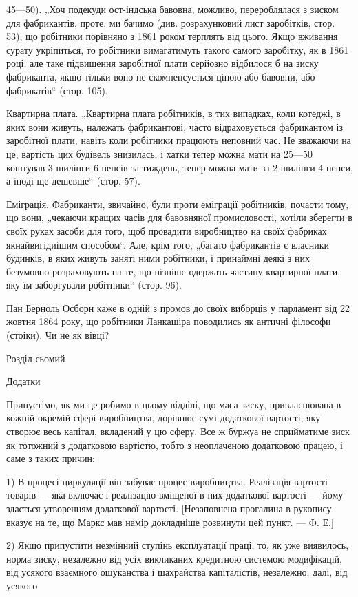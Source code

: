 45—50). „Хоч подекуди ост-індська бавовна, можливо, перероблялася
з зиском для фабрикантів, проте, ми бачимо (див. розрахунковий
лист заробітків, стор. 53), що робітники порівняно
з 1861 роком терплять від цього. Якщо вживання сурату укріпиться,
то робітники вимагатимуть такого самого заробітку, як
в 1861 році; але таке підвищення заробітної плати серйозно
відбилося б на зиску фабриканта, якщо тільки воно не скомпенсується
ціною або бавовни, або фабрикатів“ (стор. 105).

Квартирна плата. „Квартирна плата робітників, в тих випадках,
коли котеджі, в яких вони живуть, належать фабрикантові,
часто відраховується фабрикантом із заробітної плати,
навіть коли робітники працюють неповний час. Не зважаючи
на це, вартість цих будівель знизилась, і хатки тепер можна
мати на 25—50%
коштував 3 шилінги 6 пенсів за тиждень, тепер можна мати за
2 шилінги 4 пенси, а іноді ще дешевше“ (стор. 57).

Еміграція. Фабриканти, звичайно, були проти еміграції робітників,
почасти тому, що вони, „чекаючи кращих часів для бавовняної
промисловості, хотіли зберегти в своїх руках засоби
для того, щоб провадити виробництво на своїх фабриках якнайвигідиішим
способом“. Але, крім того, „багато фабрикантів
є власники будинків, в яких живуть заняті ними робітники,
і принаймні деякі з них безумовно розраховують на те, що
пізніше одержать частину квартирної плати, яку їм заборгували
робітники“ (стор. 96).

Пан Берноль Осборн каже в одній з промов до своїх виборців
у парламент від 22 жовтня 1864 року, що робітники
Ланкашіра поводились як античні філософи (стоіки). Чи не як вівці?

Розділ сьомий

Додатки

Припустімо, як ми це робимо в цьому відділі, що маса
зиску, привласнювана в кожній окремій сфері виробництва, дорівнює
сумі додаткової вартості, яку створює весь капітал, вкладений
у цю сферу. Все ж буржуа не сприйматиме зиск як тотожний
з додатковою вартістю, тобто з неоплаченою додатковою
працею, і саме з таких причин:

1) В процесі циркуляції він забуває процес виробництва.
Реалізація вартості товарів — яка включає і реалізацію вміщеної
в них додаткової вартості — йому здається утворенням додаткової
вартості. [Незаповнена прогалина в рукопису вказує на те,
що Маркс мав намір докладніше розвинути цей пункт. — Ф. Е.]

2) Якщо припустити незмінний ступінь експлуатації праці, то,
як уже виявилось, норма зиску, незалежно від усіх викликаних
кредитною системою модифікацій, від усякого взаємного ошуканства
і шахрайства капіталістів, незалежно, далі, від усякого
